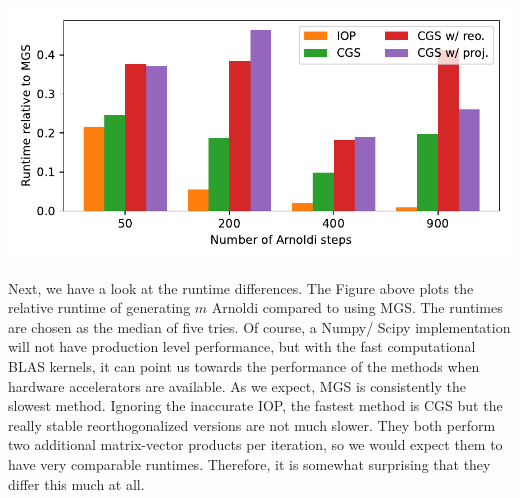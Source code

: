 \documentclass[11pt]{article}
\begin{document}
\begin{center}
    \includegraphics[width=\textwidth]{cpu_benchmark_grcar_rel}
\end{center}

Next, we have a look at the runtime differences.
The Figure above plots the relative runtime of generating $m$ Arnoldi compared to using MGS.
The runtimes are chosen as the median of five tries.
Of course, a Numpy/ Scipy implementation will not have production level performance, but with the fast computational  BLAS kernels, it can point us towards the performance of the methods when hardware accelerators are available.
As we expect, MGS is consistently the slowest method.
Ignoring the inaccurate IOP, the fastest method is CGS but the really stable reorthogonalized versions are not much slower.
They both perform two additional matrix-vector products per iteration, so we would expect them to have very comparable runtimes.
Therefore, it is somewhat surprising that they differ this much at all.
\end{document}
